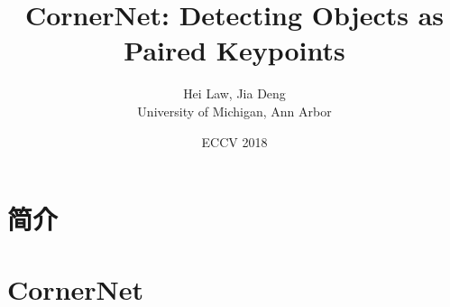\documentclass{ctexart}
\title{CornerNet: Detecting Objects as Paired Keypoints}
\author{Hei Law, Jia Deng\\ University of Michigan, Ann Arbor}
\date{ECCV 2018}
\begin{document}
\maketitle
\begin{abstract}
    
\end{abstract}
\section{简介}

\section{CornerNet}
% 
\printbibliography
\end{document}
